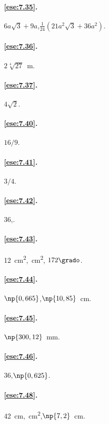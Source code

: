 \paragraph{\ref{ese:7.35}.}
\(6a\sqrt{3}+9a\),\quad \(\frac{1}{24}(21a^2\sqrt{3}+36a^2)\).

\paragraph{\ref{ese:7.36}.}
\(2\sqrt[4]{27}\)~m.

\paragraph{\ref{ese:7.37}.}
\(4\sqrt{2}\).

\paragraph{\ref{ese:7.40}.}
\(16/9\).

\paragraph{\ref{ese:7.41}.}
\(3/4\).

\paragraph{\ref{ese:7.42}.}
36,.

\paragraph{\ref{ese:7.43}.}
12~cm\textsuperscript{2},~cm\textsuperscript{2},\quad 
\(172\grado\).

\paragraph{\ref{ese:7.44}.}
\(\np{0,665}\),\quad \(\np{10,85}\)~cm.

\paragraph{\ref{ese:7.45}.}
\(\np{300,12}\)~mm.

\paragraph{\ref{ese:7.46}.}
36,\quad \(\np{0,625}\).

\paragraph{\ref{ese:7.48}.}
42~cm,~cm\textsuperscript{2},\quad \(\np{7,2}\)~cm.

